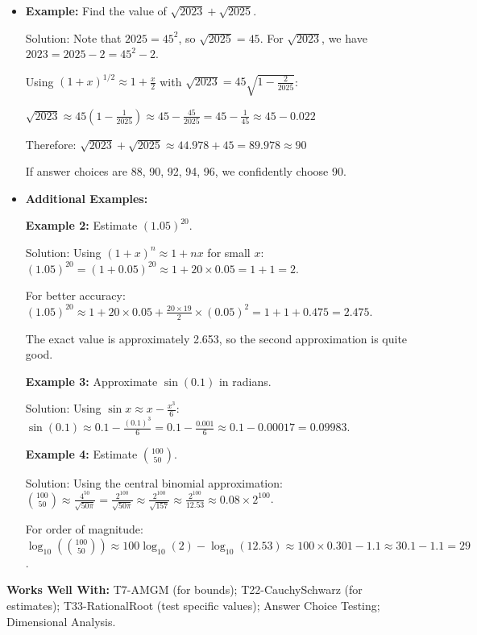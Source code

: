 \documentclass[12pt]{article}
\begin{document}
\begin{itemize}
    \item \textbf{Example:} Find the value of $\sqrt{2023} + \sqrt{2025}$.
    
    Solution: Note that $2025 = 45^2$, so $\sqrt{2025} = 45$. For $\sqrt{2023}$, we have $2023 = 2025 - 2 = 45^2 - 2$.
    
    Using $(1+x)^{1/2} \approx 1 + \frac{x}{2}$ with $\sqrt{2023} = 45\sqrt{1-\frac{2}{2025}}$:
    
    $\sqrt{2023} \approx 45\left(1 - \frac{1}{2025}\right) \approx 45 - \frac{45}{2025} = 45 - \frac{1}{45} \approx 45 - 0.022$
    
    Therefore: $\sqrt{2023} + \sqrt{2025} \approx 44.978 + 45 = 89.978 \approx 90$
    
    If answer choices are 88, 90, 92, 94, 96, we confidently choose 90.
    
    \item \textbf{Additional Examples:}

    \textbf{Example 2:} Estimate $(1.05)^{20}$.

    Solution: Using $(1+x)^n \approx 1+nx$ for small $x$:
    $(1.05)^{20} = (1+0.05)^{20} \approx 1 + 20 \times 0.05 = 1 + 1 = 2$.

    For better accuracy: $(1.05)^{20} \approx 1 + 20 \times 0.05 + \frac{20 \times 19}{2} \times (0.05)^2 = 1 + 1 + 0.475 = 2.475$.

    The exact value is approximately 2.653, so the second approximation is quite good.

    \textbf{Example 3:} Approximate $\sin(0.1)$ in radians.

    Solution: Using $\sin x \approx x - \frac{x^3}{6}$:
    $\sin(0.1) \approx 0.1 - \frac{(0.1)^3}{6} = 0.1 - \frac{0.001}{6} \approx 0.1 - 0.00017 = 0.09983$.

    \textbf{Example 4:} Estimate $\binom{100}{50}$.

    Solution: Using the central binomial approximation:
    $\binom{100}{50} \approx \frac{4^{50}}{\sqrt{50\pi}} = \frac{2^{100}}{\sqrt{50\pi}} \approx \frac{2^{100}}{\sqrt{157}} \approx \frac{2^{100}}{12.53} \approx 0.08 \times 2^{100}$.

    For order of magnitude: $\log_{10}(\binom{100}{50}) \approx 100\log_{10}(2) - \log_{10}(12.53) \approx 100 \times 0.301 - 1.1 \approx 30.1 - 1.1 = 29$.
\end{itemize}

\textbf{Works Well With:} T7-AMGM (for bounds); T22-CauchySchwarz (for estimates); T33-RationalRoot (test specific values); Answer Choice Testing; Dimensional Analysis.
\end{document}
